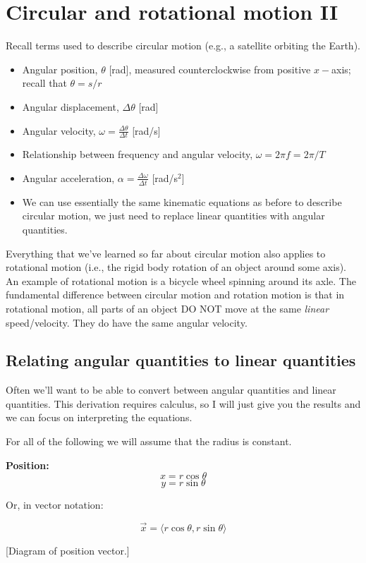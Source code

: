 \section{Circular and rotational motion II}
Recall terms used to describe circular motion (e.g., a satellite orbiting the Earth).
\begin{itemize}
\itemsep 0pt
\item Angular position, $\theta$ [rad], measured counterclockwise from positive $x-$axis; recall that $\theta=s/r$
\item Angular displacement, $\Delta\theta$ [rad]
\item Angular velocity, $\omega=\frac{\Delta\theta}{\Delta{t}}$ [rad/s]
\item Relationship between frequency and angular velocity, $\omega=2\pi f =2\pi/T$
\item Angular acceleration, $\alpha=\frac{\Delta\omega}{\Delta{t}}$ [rad/s$^2$]
\item We can use essentially the same kinematic equations as before to describe circular motion, we just need to replace linear quantities with angular quantities.
\end{itemize}

Everything that we've learned so far about circular motion also applies to rotational motion (i.e., the rigid body rotation of an object around some axis). An example of rotational motion is a bicycle wheel spinning around its axle. The fundamental difference between circular motion and rotation motion is that in rotational motion, all parts of an object DO NOT move at the same \textit{linear} speed/velocity. They do have the same angular velocity.


\subsection{Relating angular quantities to linear quantities}
Often we'll want to be able to convert between angular quantities and linear quantities. This derivation requires calculus, so I will just give you the results and we can focus on interpreting the equations.

For all of the following we will assume that the radius is constant.

\textbf{Position:}
$$x=r\cos\theta$$
$$y=r\sin\theta$$

Or, in vector notation:

$$\boxed{\vec x=\langle{r\cos\theta,r\sin\theta}\rangle}$$

[Diagram of position vector.]
\vspace{5cm}

